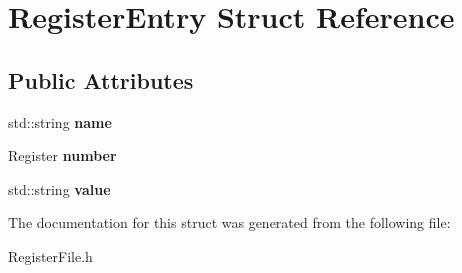 \hypertarget{struct_register_entry}{}\section{Register\+Entry Struct Reference}
\label{struct_register_entry}
\subsection*{Public Attributes}
\begin{DoxyCompactItemize}
\item 
\mbox{\label{struct_register_entry_a48b2a3dfae17a42cf163c8dc583a3c60}} 
std\+::string {\bfseries name}
\item 
\mbox{\label{struct_register_entry_a0259d7508c19b7fe2cecc00e4170abb0}} 
Register {\bfseries number}
\item 
\mbox{\label{struct_register_entry_a462a570891acb7e856ad2ea0e1e12eb6}} 
std\+::string {\bfseries value}
\end{DoxyCompactItemize}


The documentation for this struct was generated from the following file\+:\begin{DoxyCompactItemize}
\item 
Register\+File.\+h\end{DoxyCompactItemize}
